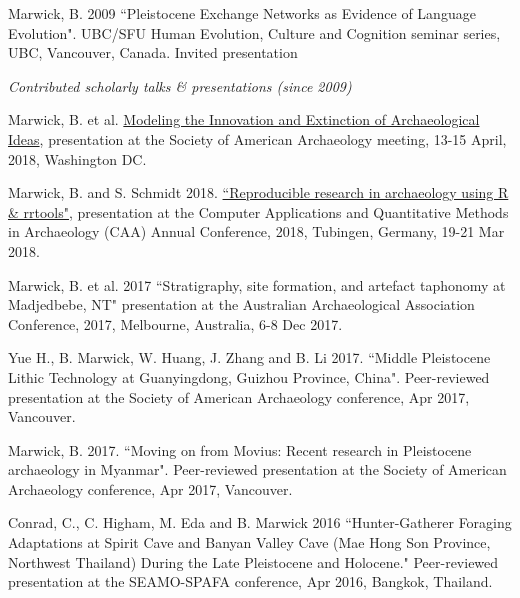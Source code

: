 \ind Marwick, B. 2009 ``Pleistocene Exchange Networks as Evidence of Language Evolution".  UBC/SFU Human Evolution, Culture and Cognition seminar series, UBC, Vancouver, Canada. Invited presentation

\bigskip



\noindent\emph{Contributed scholarly talks \& presentations (since 2009)\vspace{0.01in}}

\medskip

\ind Marwick, B. et al. {\href{https://osf.io/tz6s5/}{Modeling the Innovation and Extinction of Archaeological Ideas}}, presentation at the Society of American Archaeology meeting, 13-15 April, 2018, Washington DC.

\ind Marwick, B. and S. Schmidt 2018.  {\href{https://github.com/benmarwick/caa2018-Tubingen}{``Reproducible research in archaeology using R \& rrtools"}}, presentation at the Computer Applications and Quantitative Methods in Archaeology (CAA) Annual Conference, 2018, Tubingen, Germany, 19-21 Mar 2018.

\ind  Marwick, B. et al. 2017 ``Stratigraphy, site formation, and artefact taphonomy at Madjedbebe, NT"  presentation at the Australian Archaeological Association Conference, 2017, Melbourne, Australia, 6-8 Dec 2017.

\ind  Yue H., B. Marwick, W. Huang, J. Zhang and B. Li  2017. ``Middle Pleistocene Lithic Technology at Guanyingdong, Guizhou Province, China".  Peer-reviewed presentation at the Society of American Archaeology conference, Apr 2017, Vancouver.

\ind  Marwick, B. 2017. ``Moving on from Movius: Recent research in Pleistocene archaeology in Myanmar".  Peer-reviewed presentation at the Society of American Archaeology conference, Apr 2017, Vancouver.

\ind Conrad, C., C. Higham, M. Eda and B. Marwick 2016 ``Hunter-Gatherer Foraging Adaptations at Spirit Cave and Banyan Valley Cave (Mae Hong Son Province, Northwest Thailand) During the Late Pleistocene and Holocene." Peer-reviewed presentation at the SEAMO-SPAFA conference, Apr 2016, Bangkok, Thailand.

